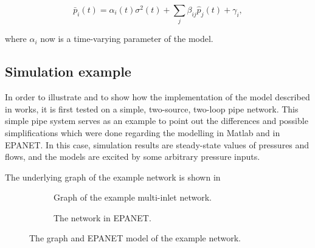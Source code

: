 \begin{equation}
\label{model_multiinlet1}
\bar{p}_i(t) = \alpha_i(t) \sigma^2(t) + \sum_j \beta_{ij} \hat{p}_j(t) + \gamma_i,
\end{equation}

where $\alpha_i$ now is a time-varying parameter of the model. 

\subsection{Simulation example}
\label{multi_inlet_network_example}

In order to illustrate and to show how the implementation of the model described in  works, it is first tested on a simple, two-source, two-loop pipe network. This simple pipe system serves as an example to point out the differences and possible simplifications which were done regarding the modelling in Matlab and in EPANET. In this case, simulation results are steady-state values of pressures and flows, and the models are excited by some arbitrary pressure inputs. 

The underlying graph of the example network is shown in 




\begin{figure}[H]
\centering
\begin{subfigure}{.49\textwidth}
\centering
\hspace{3mm}
 
\vspace{2mm}
\caption{Graph of the example multi-inlet network.}
\label{fig:example1_graph}
\end{subfigure}
\begin{subfigure}{.49\textwidth}
\centering
\hspace{0mm}
 
\vspace{3mm}
  \caption{The network in EPANET.}
  \label{fig:example_EPANET}
\end{subfigure}
\caption{The graph and EPANET model of the example network.}
\label{fig:example_sum}
\end{figure}
\vspace{-3mm}

%  

